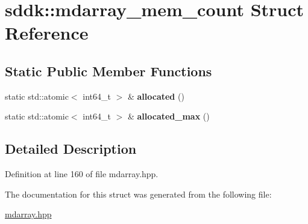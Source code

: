 \hypertarget{structsddk_1_1mdarray__mem__count}{}\section{sddk\+:\+:mdarray\+\_\+mem\+\_\+count Struct Reference}
\label{structsddk_1_1mdarray__mem__count}
\subsection*{Static Public Member Functions}
\begin{DoxyCompactItemize}
\item 
\hypertarget{structsddk_1_1mdarray__mem__count_a4156b66b4919a222ad55ef8b94f8040c}{}static std\+::atomic$<$ int64\+\_\+t $>$ \& {\bfseries allocated} ()\label{structsddk_1_1mdarray__mem__count_a4156b66b4919a222ad55ef8b94f8040c}

\item 
\hypertarget{structsddk_1_1mdarray__mem__count_a65d7db3eb9c3952c217e431ae8969628}{}static std\+::atomic$<$ int64\+\_\+t $>$ \& {\bfseries allocated\+\_\+max} ()\label{structsddk_1_1mdarray__mem__count_a65d7db3eb9c3952c217e431ae8969628}

\end{DoxyCompactItemize}


\subsection{Detailed Description}


Definition at line 160 of file mdarray.\+hpp.



The documentation for this struct was generated from the following file\+:\begin{DoxyCompactItemize}
\item 
\hyperlink{mdarray_8hpp}{mdarray.\+hpp}\end{DoxyCompactItemize}
